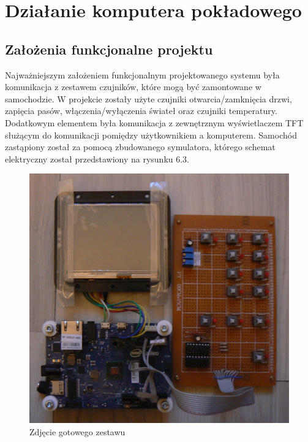 \documentclass{xmgr}
\begin{document}

\chapter{Działanie komputera pokładowego}
\section{Założenia funkcjonalne projektu}
Najważniejszym założeniem funkcjonalnym projektowanego systemu była komunikacja z zestawem czujników, które mogą być zamontowane w samochodzie. W projekcie zostały użyte czujniki otwarcia/zamknięcia drzwi, zapięcia pasów, włączenia/wyłączenia świateł oraz czujniki temperatury. Dodatkowym elementem była komunikacja z zewnętrznym wyświetlaczem TFT służącym do komunikacji pomiędzy użytkownikiem a komputerem. Samochód zastąpiony został za pomocą zbudowanego symulatora, którego schemat elektryczny został przedstawiony na rysunku 6.3.

\begin{figure}[!h]
    \centering
    	\includegraphics[height=0.35\textheight]{images/zestaw.jpg}
    \caption{Zdjęcie gotowego zestawu}
\end{figure}
\end{document}
